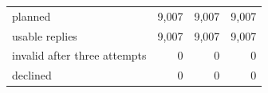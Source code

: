\begin{tabular}{p{6.6cm}rrr}
planned & 9,007 & 9,007 & 9,007 \\
usable replies & 9,007 & 9,007 & 9,007 \\
invalid after three attempts & 0 & 0 & 0 \\
declined & 0 & 0 & 0 \\
\bottomrule
\end{tabular}
